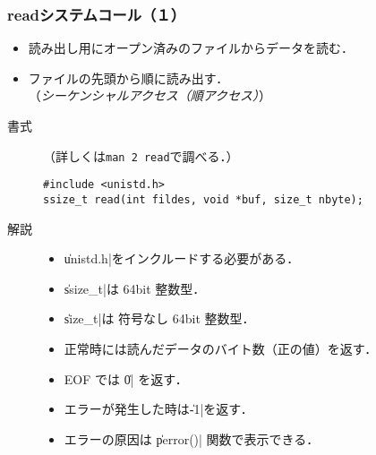 \documentclass{beamer}                 %
\begin{document}
\begin{frame}[fragile]
  \frametitle{readシステムコール（１）}
\begin{itemize}
\item 読み出し用にオープン済みのファイルからデータを読む．
\item ファイルの先頭から順に読み出す．\\
（\emph{シーケンシャルアクセス（順アクセス）}）
\end{itemize}

\begin{description}
\item[書式]（詳しくは\texttt{man 2 read}で調べる．）

\begin{lstlisting}
#include <unistd.h>
ssize_t read(int fildes, void *buf, size_t nbyte);
\end{lstlisting}

\item[解説]
\begin{itemize}
\item \|unistd.h|をインクルードする必要がある．
\item \|ssize_t|は 64bit 整数型．
\item \|size_t|は 符号なし 64bit 整数型．
\item 正常時には読んだデータのバイト数（正の値）を返す．
\item EOF では \|0| を返す．
\item エラーが発生した時は\|-1|を返す．
\item エラーの原因は \|perror()| 関数で表示できる．
\end{itemize}

\end{description}
\end{frame}
\end{document}
